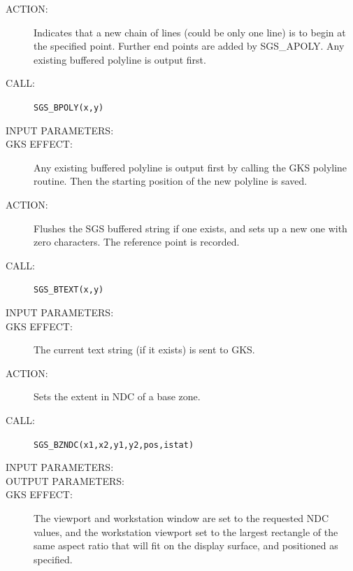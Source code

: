 \documentclass[11pt]{article}
\newcommand{\htmlref}[2]{#1}
\begin{document}
\begin{description}
\item [ACTION:]
Indicates that a new chain of lines (could be only one line) is to begin at the
specified point.
Further end points are added by \htmlref{SGS\_APOLY}{SGS_APOLY}.
Any existing buffered polyline is output first.
\item [CALL:]
{\tt SGS\_BPOLY(x,y)}
\item [INPUT PARAMETERS:]
\begin{params}
\end{params}
\item [GKS EFFECT:]
Any existing buffered polyline is output first by calling the GKS polyline
routine.
Then the starting position of the new polyline is saved.
\end{description}
\goodbreak

\begin{description}
\item [ACTION:]
Flushes the SGS buffered string if one exists, and sets up a new one with zero
characters.
The reference point is recorded.
\item [CALL:]
{\tt SGS\_BTEXT(x,y)}
\item [INPUT PARAMETERS:]
\begin{params}
\end{params}
\item [GKS EFFECT:]
The current text string (if it exists) is sent to GKS.
\end{description}
\goodbreak

\begin{description}
\item [ACTION:]
Sets the extent in NDC of a base zone.
\item [CALL:]
{\tt SGS\_BZNDC(x1,x2,y1,y2,pos,istat)}
\item [INPUT PARAMETERS:]
\begin{params}
\end{params}
\item [OUTPUT PARAMETERS:]
\begin{params}
\end{params}
\item [GKS EFFECT:]
The viewport and workstation window are set to the requested NDC values, and the
workstation viewport set to the largest rectangle of the same aspect ratio that
will fit on the display surface, and positioned as specified.
\end{description}
\goodbreak
\end{document}
